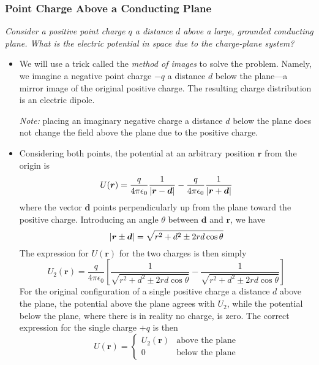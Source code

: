 \documentclass[11pt, a4paper]{article}
\renewcommand{\vec}[1]{\bm{#1}} %
\renewcommand{\r}{\vec{r}}
\newcommand{\e}{\epsilon_{0}}  %
\begin{document}
\subsubsection{Point Charge Above a Conducting Plane}
\textit{Consider a positive point charge $ q $ a distance $ d $ above a large, grounded conducting plane. What is the electric potential in space due to the charge-plane system?}
\begin{itemize}
	\item We will use a trick called the \textit{method of images} to solve the problem. 
	Namely, we imagine a negative point charge $ -q $ a distance $ d $ below the plane---a mirror image of the original positive charge. The resulting charge distribution is an electric dipole. 
	
	\textit{Note:} placing an imaginary negative charge a distance $ d $ below the plane does not change the field above the plane due to the positive charge. 
	
	\item Considering both points, the potential at an arbitrary position $ \r $ from the origin is
	\begin{equation*}
		U(\r) = \frac{q}{4\pi \e}\frac{1}{\abs{\r - \vec{d}}} - \frac{q}{4\pi \e}\frac{1}{\abs{\r + \vec{d}}} 
	\end{equation*}
	where the vector $ \vec{d} $ points perpendicularly up from the plane toward the positive charge. Introducing an angle $ \theta $ between $ \vec{d} $ and $ \r $, we have
	\begin{equation*}
		\abs{\r \pm \vec{d}} = \sqrt{r^{2}+d^{2} \pm 2rd\cos \theta}
	\end{equation*}
	The expression for $ U(\r) $ for the two charges is then simply
	\begin{equation*}
		U_{2}(\r) = \frac{q}{4\pi \e}\left[\frac{1}{\sqrt{r^{2}+d^{2} \pm 2rd\cos \theta}} - \frac{1}{\sqrt{r^{2}+d^{2} \pm 2rd\cos \theta}}\right]
	\end{equation*}
	For the original configuration of a single positive charge a distance $ d $ above the plane, the potential above the plane agrees with $ U_{2} $, while the potential below the plane, where there is in reality no charge, is zero. The correct expression for the single charge $ +q $ is then
	\begin{equation*}
		U(\r) = 
		\begin{cases}
			U_{2}(\r) & \text{above the plane}\\
			0 & \text{below the plane}
		\end{cases}
	\end{equation*}
	

\end{itemize}
\end{document}

